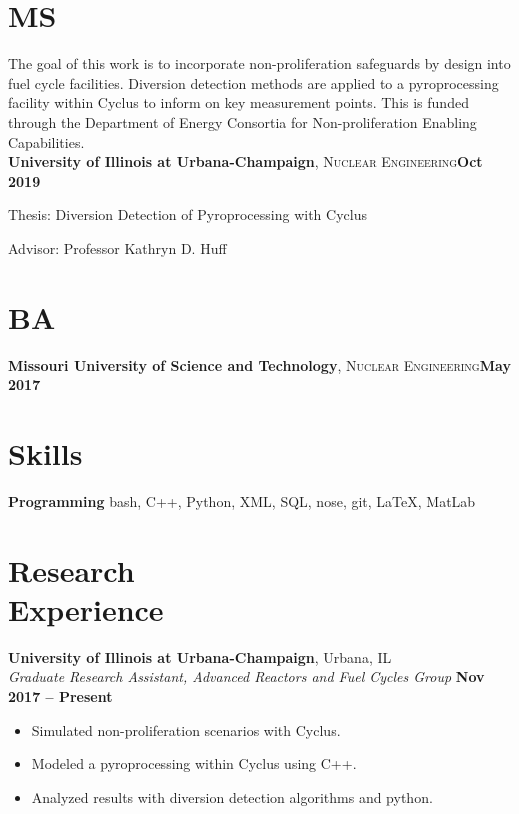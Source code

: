 \documentclass[margin,line]{resume}
\begin{document}
\begin{resume}
    \section{\mysidestyle MS}
    The goal of this work is to incorporate non-proliferation safeguards by design into fuel cycle facilities. Diversion detection methods are applied to a pyroprocessing facility
    within Cyclus to inform on key measurement points. This is funded through the
    Department of Energy Consortia for Non-proliferation Enabling Capabilities.\\
    \textbf{University of Illinois at Urbana-Champaign}, \textsc{Nuclear Engineering}\hfill \textbf{Oct 2019}\vspace{-3mm}\\\vspace{-1mm}%
    \begin{list2}
        \item Thesis: Diversion Detection of Pyroprocessing with Cyclus
        \item Advisor:  Professor Kathryn D. Huff
    \end{list2}\vspace{-1.5mm}
    \section{\mysidestyle BA}
    \textbf{Missouri University of Science and Technology}, \textsc{Nuclear Engineering}\hfill\textbf{May 2017}\vspace{-3mm}\\\vspace{-1mm}%
    \section{\mysidestyle Skills}
    \textbf{Programming} \hfill bash, C++, Python, XML, SQL, nose, git, \LaTeX, MatLab\vspace{.5mm}%
    \section{\mysidestyle Research\\Experience}
    \textbf{University of Illinois at Urbana-Champaign}, Urbana, IL\\
		\textsl{Graduate Research Assistant, Advanced Reactors and Fuel Cycles Group} \hfill \textbf{Nov 2017 -- Present}\\
		\begin{itemize}
			\item Simulated non-proliferation scenarios with Cyclus.
			\item Modeled a pyroprocessing within Cyclus using C++.
			\item Analyzed results with diversion detection algorithms and python.
		\end{itemize}


\end{resume}
\end{document}
